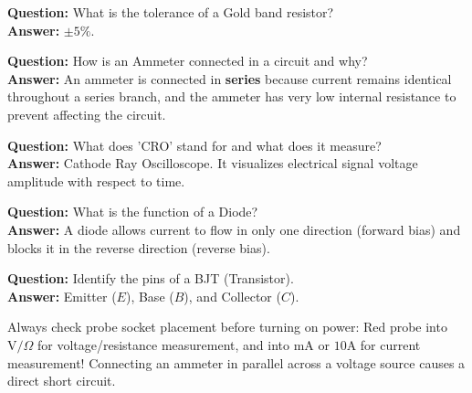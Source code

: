 \begin{vivaqa}
\textbf{Question:} What is the tolerance of a Gold band resistor?\\[4pt]
\textbf{Answer:} $\pm 5\%$.
\end{vivaqa}

\begin{vivaqa}
\textbf{Question:} How is an Ammeter connected in a circuit and why?\\[4pt]
\textbf{Answer:} An ammeter is connected in \textbf{series} because current remains identical throughout a series branch, and the ammeter has very low internal resistance to prevent affecting the circuit.
\end{vivaqa}

\begin{vivaqa}
\textbf{Question:} What does 'CRO' stand for and what does it measure?\\[4pt]
\textbf{Answer:} Cathode Ray Oscilloscope. It visualizes electrical signal voltage amplitude with respect to time.
\end{vivaqa}

\begin{vivaqa}
\textbf{Question:} What is the function of a Diode?\\[4pt]
\textbf{Answer:} A diode allows current to flow in only one direction (forward bias) and blocks it in the reverse direction (reverse bias).
\end{vivaqa}

\begin{vivaqa}
\textbf{Question:} Identify the pins of a BJT (Transistor).\\[4pt]
\textbf{Answer:} Emitter ($E$), Base ($B$), and Collector ($C$).
\end{vivaqa}

\begin{examtip}
Always check probe socket placement before turning on power: Red probe into $\text{V}/\Omega$ for voltage/resistance measurement, and into $\text{mA}$ or $10\text{A}$ for current measurement! Connecting an ammeter in parallel across a voltage source causes a direct short circuit.
\end{examtip}
